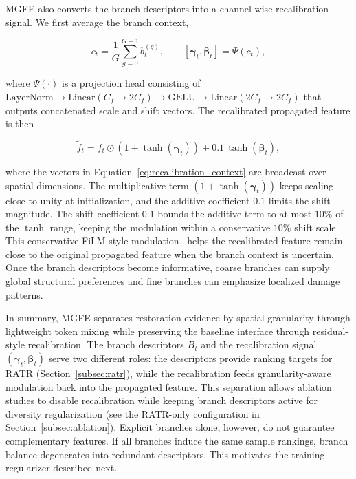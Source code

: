 \documentclass[symmetry,article,submit,pdftex,moreauthors]{Definitions/mdpi}
\begin{document}
MGFE also converts the branch descriptors into a channel-wise recalibration signal. We first average the branch context,

\begin{equation}
c_t = \frac{1}{G}\sum_{g=0}^{G-1}b_t^{(g)},
\qquad
[\boldsymbol{\gamma}_t,\boldsymbol{\beta}_t] = \Psi(c_t),
\label{eq:recalibration_context}
\end{equation}

where $\Psi(\cdot)$ is a projection head consisting of $\mathrm{LayerNorm}\!\rightarrow\!\mathrm{Linear}(C_f\!\rightarrow\!2C_f)\!\rightarrow\!\mathrm{GELU}\!\rightarrow\!\mathrm{Linear}(2C_f\!\rightarrow\!2C_f)$ that outputs concatenated scale and shift vectors. The recalibrated propagated feature is then

\begin{equation}
\widetilde{f}_t =
f_t \odot
\left(1+\tanh(\boldsymbol{\gamma}_t)\right)
+ 0.1\,\tanh(\boldsymbol{\beta}_t),
\label{eq:recalibration}
\end{equation}

where the vectors in Equation~\eqref{eq:recalibration_context} are broadcast over spatial dimensions. The multiplicative term $(1+\tanh(\boldsymbol{\gamma}_t))$ keeps scaling close to unity at initialization, and the additive coefficient $0.1$ limits the shift magnitude. The shift coefficient $0.1$ bounds the additive term to at most $10\%$ of the $\tanh$ range, keeping the modulation within a conservative $10\%$ shift scale. This conservative FiLM-style modulation~\cite{perez2018film} helps the recalibrated feature remain close to the original propagated feature when the branch context is uncertain. Once the branch descriptors become informative, coarse branches can supply global structural preferences and fine branches can emphasize localized damage patterns.

In summary, MGFE separates restoration evidence by spatial granularity through lightweight token mixing while preserving the baseline interface through residual-style recalibration. The branch descriptors $B_t$ and the recalibration signal $(\boldsymbol{\gamma}_t, \boldsymbol{\beta}_t)$ serve two different roles: the descriptors provide ranking targets for RATR (Section~\ref{subsec:ratr}), while the recalibration feeds granularity-aware modulation back into the propagated feature. This separation allows ablation studies to disable recalibration while keeping branch descriptors active for diversity regularization (see the RATR-only configuration in Section~\ref{subsec:ablation}). Explicit branches alone, however, do not guarantee complementary features. If all branches induce the same sample rankings, branch balance degenerates into redundant descriptors. This motivates the training regularizer described next.
\end{document}

